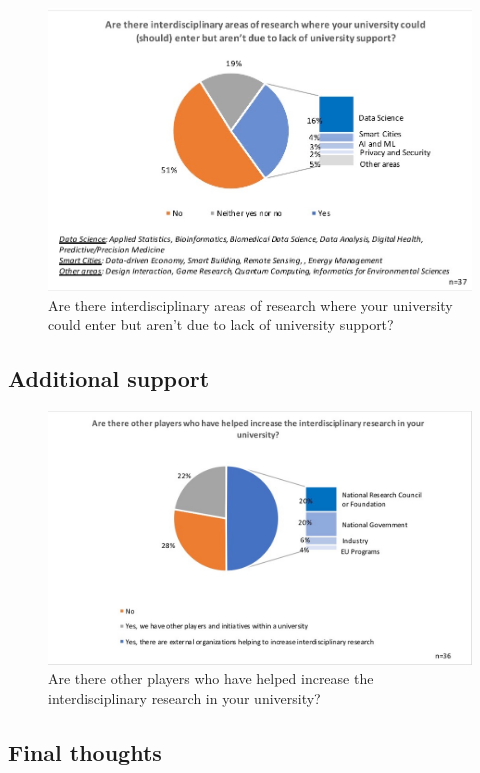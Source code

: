 \begin{figure}[h]
\centering
\includegraphics[width = \linewidth]{charts/1c.jpg}
\caption{Are there interdisciplinary areas of research where your university
could enter but aren't due to lack of university support?}
\label{sect1:support}
\end{figure}

\subsection {Additional support}

\begin{figure}[h]
\centering
\includegraphics[width = \linewidth]{charts/1d.jpg}
\caption
{Are there other players who have helped increase the
interdisciplinary research in your university?}
\label{sect1:additional}
\end{figure}

\subsection{Final thoughts}


